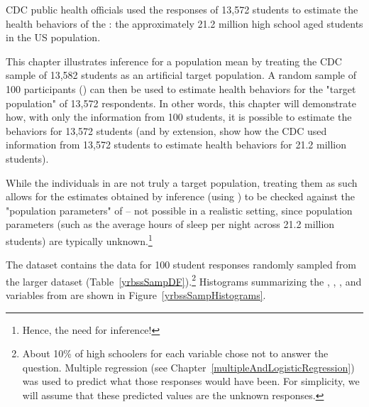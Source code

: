 \begin{spacing}{1.5}

CDC public health officials used the responses of 13,572 students to estimate the health behaviors of the : the approximately 21.2 million high school aged students in the US population. 

This chapter illustrates inference for a population mean by treating the CDC sample of 13,582 students as an artificial target population. A random sample of 100 participants () can then be used to estimate health behaviors for the "target population" of 13,572 respondents. In other words, this chapter will demonstrate how, with only the information from 100 students, it is possible to estimate the behaviors for 13,572 students (and by extension, show how the CDC used information from 13,572 students to estimate health behaviors for 21.2 million students).  

While the individuals in  are not truly a target population, treating them as such allows for the estimates obtained by inference (using ) to be checked against the "population parameters" of  -- not possible in a realistic setting, since population parameters (such as the average hours of sleep per night across 21.2 million students) are typically unknown.\footnote{Hence, the need for inference!}

The dataset  contains the data for 100 student responses randomly sampled from the larger  dataset (Table~\ref{yrbssSampDF}).\footnote{About 10\% of high schoolers for each variable chose not to answer the question. Multiple regression (see Chapter~\ref{multipleAndLogisticRegression}) was used to predict what those responses would have been. For simplicity, we will assume that these predicted values are the unknown responses.} Histograms summarizing the , , , and  variables from  are shown in Figure~\ref{yrbssSampHistograms}.


\end{spacing}
